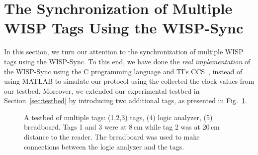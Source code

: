\documentclass[journal,draftcls,onecolumn,12pt,twoside]{IEEEtranTCOM}
\begin{document}
\section{The Synchronization of Multiple WISP Tags Using the WISP-Sync}
\label{sec:multi-wisp}

In this section, we turn our attention to the synchronization of  multiple WISP tags using the WISP-Sync. To this end, we have done the \emph{real implementation} of the WISP-Sync using the C programming language and TI's CCS~\cite{ti_css}, instead of using MATLAB to simulate our protocol using the collected the clock values from our testbed. Moreover, we extended our experimental testbed in Section~\ref{sec:testbed} by introducing two additional tags, as presented in Fig.~\ref{fig:testbed-new}. 


\begin{figure}
	\centering
\caption{\label{fig:testbed-new} A testbed of multiple tags: (1,2,3) tags, (4) logic analyzer, (5) breadboard. Tags 1 and 3 were at 8\,cm while tag 2 was at 20\,cm distance to the reader. The breadboard was used to make connections between the logic analyzer and the tags.} 
\end{figure}
\end{document}
